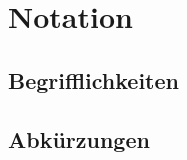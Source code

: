 \chapter{Notation}
\label{ch:notation}

\blindtext

\section{Begrifflichkeiten}
\label{sec:notation:definitions}

\blindtext

\section{Abkürzungen}
\label{sec:notation:abbreviations}

\blindtext